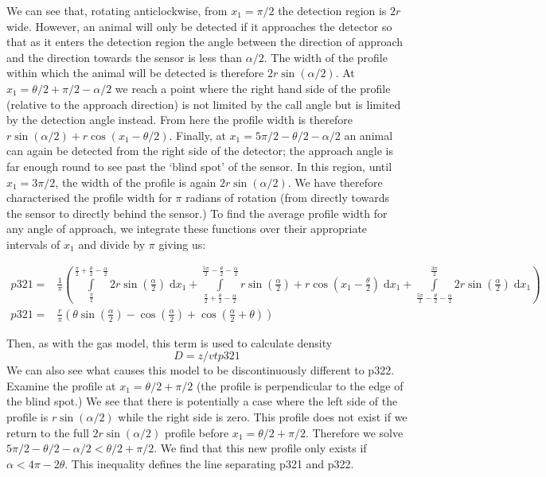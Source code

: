 \documentclass[a4paper,10pt,reqno,oneside]{amsart}
\begin{document}
We can see that, rotating anticlockwise, from $x_1  = \pi/2$ the detection region is $2r$ wide. However, an animal will only be detected if it approaches the detector so that as it enters the detection region the angle between the direction of approach and the direction towards the sensor is less than $\alpha/2$. The width of the profile within which the animal will be detected is therefore $2r\sin(\alpha/2)$. At $x_1  = \theta/2 + \pi/2 - \alpha/2$ we reach a point where the right hand side of the profile (relative to the approach direction) is not limited by the call angle but is limited by the detection angle instead. From here the profile width is therefore $r\sin( \alpha/2) + r\cos( x_1  - \theta/2)$. Finally, at $x_1  = 5\pi/2 - \theta/2  - \alpha/2$ an animal can again be detected from the right side of the detector; the approach angle is far enough round to see past the `blind spot' of the sensor. In this region, until $x_1  = 3\pi/2$, the width of the profile is again $2r\sin( \alpha/2)$. We have therefore characterised the profile width for $\pi$ radians of rotation (from directly towards the sensor to directly behind the sensor.) To find the average profile width for any angle of approach, we integrate these functions over their appropriate intervals of $x_1 $ and divide by $\pi$ giving us:

\begin{align}
    p321 =&\frac{1}{\pi} \left(\int\limits_{\frac{\pi}{2}}^{\frac{\pi}{2} + \frac{\theta}{2} - \frac{\alpha}{2}}2 r \sin{\left (\frac{\alpha}{2} \right )}\;\mathrm{d}x_1+\int\limits_{\frac{\pi}{2} + \frac{\theta}{2} - \frac{\alpha}{2}}^{\frac{5 \pi}{2} - \frac{\theta}{2} - \frac{\alpha}{2}}r \sin{\left (\frac{\alpha}{2} \right )} + r \cos{\left (x_1 - \frac{\theta}{2} \right )}\;\mathrm{d}x_1+\int\limits_{\frac{5 \pi}{2} - \frac{\theta}{2} - \frac{\alpha}{2}}^{\frac{3 \pi}{2}}2 r \sin{\left (\frac{\alpha}{2} \right )}\;\mathrm{d}x_1\right)\\
    p321 =& \frac{r}{\pi} \left(\theta \sin{\left (\frac{\alpha}{2} \right )} - \cos{\left (\frac{\alpha}{2} \right )} + \cos{\left (\frac{\alpha}{2} + \theta \right )}\right) \label{e:p321}
\end{align}

Then, as with the gas model, this term is used to calculate density
\begin{equation}
\label{e:gas}
D = z/vtp321
\end{equation}
We can also see what causes this model to be discontinuously different to p322. Examine the profile at $x_1 = 	\theta/2 + \pi/2$ (the profile is perpendicular to the edge of the blind spot.) We see that there is potentially a case where the left side of the profile is $r\sin( \alpha/2)$ while the right side is zero. This profile does not exist if we return to the full $2r\sin( \alpha/2)$ profile before $x_1  = \theta/2 + \pi/2$. Therefore we solve $5\pi/2 - \theta/2 - \alpha/2 <  \theta/2 + \pi/2$. We find that this new profile only exists if $ \alpha < 4\pi - 2 \theta$. This inequality defines the line separating p321 and p322.
\end{document}
